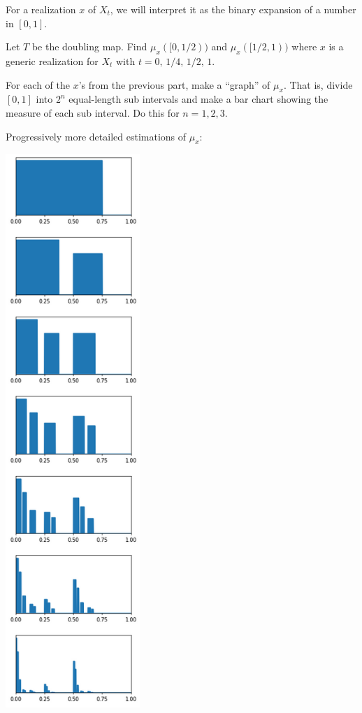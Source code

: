 	For a realization $x$ of $X_t$, we will interpret it as the binary expansion of a number in $[0,1]$.
	\begin{parts}
		\item Let $T$ be the doubling map. Find $\mu_x([0,1/2))$ and $\mu_x([1/2,1))$ where $x$ is a generic realization for
			$X_t$ with $t=0,\,1/4,\,1/2,\,1$.
		\item For each of the $x$'s from the previous part, make a ``graph'' of $\mu_x$. That is, divide $[0,1]$ into $2^n$
			equal-length sub intervals and make a bar chart showing the measure of each sub interval. Do this for $n=1,2,3$.
	\end{parts}
	
	\newpage
		Progressively more detailed estimations of $\mu_x$:
		\begin{center}
			\includegraphics[width=2in]{images/markov-measure-pullback.png}
		\end{center}

